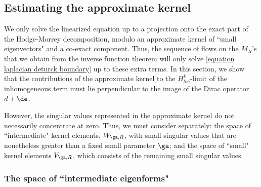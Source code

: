 \documentclass[hidelinks, 12pt, oneside, reqno]{amsart}
\begin{document}

\subsection{Estimating the approximate kernel} \label{section est approx ker}
We only solve the linearized equation up to a projection onto the exact part of the Hodge-Morrey decomposition, modulo an approximate kernel of ``small eigenvectors" and a co-exact component. Thus, the sequence of flows on the $M_R$'s that we obtain from the inverse function theorem will only solve \eqref{equation laplacian deturck boundary} up to these extra terms. In this section, we show that the contributions of the approximate kernel to the $H^k_{loc}$-limit of the inhomogeneous term must lie perpendicular to the image of the Dirac operator $d + \de$.

However, the singular values represented in the approximate kernel do not necessarily concentrate at zero. Thus, we must consider separately: the space of ``intermediate" kernel elements, $W_{\ga,R}$, with small singular values that are nonetheless greater than a fixed small parameter $\ga$; and the space of ``small" kernel elements $V_{\ga, R}$, which consists of the remaining small singular values. 

\subsubsection{The space of ``intermediate eigenforms"}
\end{document}

